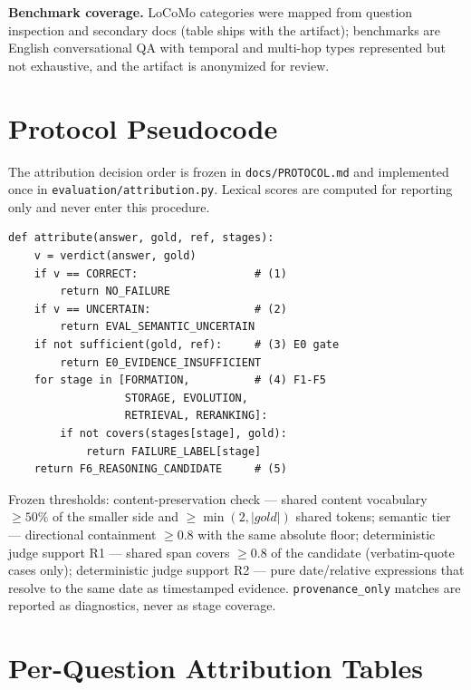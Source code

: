 \documentclass[11pt]{article}
\begin{document}
\textbf{Benchmark coverage.} LoCoMo categories were mapped from question
inspection and secondary docs (table ships with the artifact); benchmarks
are English conversational QA with temporal and multi-hop types
represented but not exhaustive, and the artifact is anonymized for review.




\appendix

\section{Protocol Pseudocode}
\label{app:pseudocode}

The attribution decision order is frozen in \texttt{docs/PROTOCOL.md} and
implemented once in \texttt{evaluation/attribution.py}. Lexical scores are
computed for reporting only and never enter this procedure.

\begingroup\scriptsize
\begin{verbatim}
def attribute(answer, gold, ref, stages):
    v = verdict(answer, gold)
    if v == CORRECT:                  # (1)
        return NO_FAILURE
    if v == UNCERTAIN:                # (2)
        return EVAL_SEMANTIC_UNCERTAIN
    if not sufficient(gold, ref):     # (3) E0 gate
        return E0_EVIDENCE_INSUFFICIENT
    for stage in [FORMATION,          # (4) F1-F5
                  STORAGE, EVOLUTION,
                  RETRIEVAL, RERANKING]:
        if not covers(stages[stage], gold):
            return FAILURE_LABEL[stage]
    return F6_REASONING_CANDIDATE     # (5)
\end{verbatim}
\endgroup

Frozen thresholds: content-preservation check --- shared content
vocabulary $\geq 50\%$ of the smaller side and $\geq \min(2, |gold|)$
shared tokens; semantic tier --- directional containment $\geq 0.8$ with
the same absolute floor; deterministic judge support R1 --- shared span
covers $\geq 0.8$ of the candidate (verbatim-quote cases only);
deterministic judge support R2 --- pure date/relative expressions that
resolve to the same date as timestamped evidence. \verb|provenance_only|
matches are reported as diagnostics, never as stage coverage.

\section{Per-Question Attribution Tables}
\label{app:traces}
\end{document}
